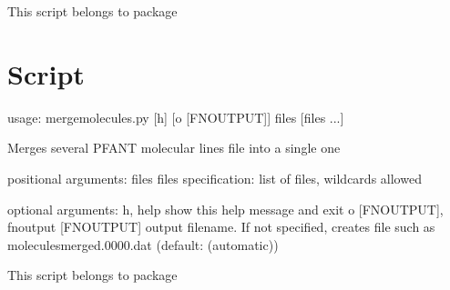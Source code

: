 \documentclass[letterpaper,10pt,english]{sphinxmanual}
\begin{document}
This script belongs to package 


\section{Script }
\label{\detokenize{autoscripts/script-merge-molecules:script-merge-molecules-py}}\label{\detokenize{autoscripts/script-merge-molecules::doc}}
\begin{sphinxVerbatim}[commandchars=\\\{\}]
usage: merge\PYGZhy{}molecules.py [\PYGZhy{}h] [\PYGZhy{}o [FN\PYGZus{}OUTPUT]] files [files ...]

Merges several PFANT molecular lines file into a single one

positional arguments:
  files                 files specification: list of files, wildcards allowed

optional arguments:
  \PYGZhy{}h, \PYGZhy{}\PYGZhy{}help            show this help message and exit
  \PYGZhy{}o [FN\PYGZus{}OUTPUT], \PYGZhy{}\PYGZhy{}fn\PYGZus{}output [FN\PYGZus{}OUTPUT]
                        output filename. If not specified, creates file such
                        as \PYGZsq{}molecules\PYGZhy{}merged\PYGZhy{}.0000.dat\PYGZsq{} (default: (automatic))
\end{sphinxVerbatim}

This script belongs to package 
\end{document}
